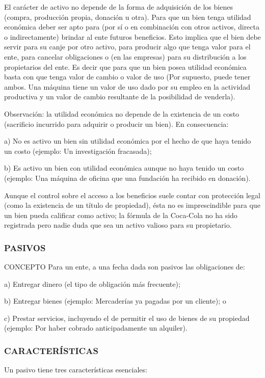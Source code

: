 El carácter de activo no depende de la forma de adquisición de los bienes (compra, producción propia, donación u otra). Para que un bien tenga utilidad económica deber ser apto para (por sí o en combinación con otros activos, directa o indirectamente) brindar al ente futuros beneficios. Esto implica que el bien debe servir para su canje por otro activo, para producir algo que tenga valor para el ente, para cancelar obligaciones o (en las empresas) para su distribución a los propietarios del ente. Es decir que para que un bien posea utilidad económica basta con que tenga valor de cambio o valor de uso (Por supuesto, puede tener ambos. Una máquina tiene un valor de uso dado por su empleo en la actividad productiva y un valor de cambio resultante de la posibilidad de venderla).

Observación: la utilidad económica no depende de la existencia de un costo (sacrificio incurrido para adquirir o producir un bien). En consecuencia:

a) No es activo un bien sin utilidad económica por el hecho de que haya tenido un costo (ejemplo: Un investigación fracasada);

b) Es activo un bien con utilidad económica aunque no haya tenido un costo (ejemplo: Una máquina de oficina que una fundación ha recibido en donación).

Aunque el control sobre el acceso a los beneficios suele contar con protección legal (como la existencia de un título de propiedad), ésta no es imprescindible para que un bien pueda calificar como activo; la fórmula de la Coca-Cola no ha sido registrada pero nadie duda que sea un activo valioso para su propietario.

\subsubsection*{PASIVOS}
CONCEPTO Para un ente, a una fecha dada son pasivos las obligaciones de:

a) Entregar dinero (el tipo de obligación más frecuente);

{\centering b) Entregar bienes (ejemplo: Mercaderías ya pagadas por un cliente); o\par}

c) Prestar servicios, incluyendo el de permitir el uso de bienes de su propiedad (ejemplo: Por haber cobrado anticipadamente un alquiler).

\subsubsection*{CARACTERÍSTICAS}
Un pasivo tiene tres características esenciales:

